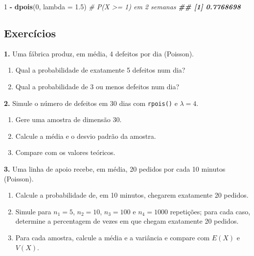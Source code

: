 \documentclass[
  portuguese,
  11pt,
  openany]{book}
\newenvironment{Shaded}{\begin{snugshade}}{\end{snugshade}}
\newcommand{\AttributeTok}[1]{\textcolor[rgb]{0.13,0.29,0.53}{#1}}
\newcommand{\CommentTok}[1]{\textcolor[rgb]{0.56,0.35,0.01}{\textit{#1}}}
\newcommand{\DecValTok}[1]{\textcolor[rgb]{0.00,0.00,0.81}{#1}}
\newcommand{\DocumentationTok}[1]{\textcolor[rgb]{0.56,0.35,0.01}{\textbf{\textit{#1}}}}
\newcommand{\FloatTok}[1]{\textcolor[rgb]{0.00,0.00,0.81}{#1}}
\newcommand{\FunctionTok}[1]{\textcolor[rgb]{0.13,0.29,0.53}{\textbf{#1}}}
\newcommand{\NormalTok}[1]{#1}
\newcommand{\SpecialCharTok}[1]{\textcolor[rgb]{0.81,0.36,0.00}{\textbf{#1}}}
\providecommand{\tightlist}{%
  \setlength{\itemsep}{0pt}\setlength{\parskip}{0pt}}
\begin{document}
\begin{Shaded}
\begin{Highlighting}[]
\DecValTok{1} \SpecialCharTok{{-}} \FunctionTok{dpois}\NormalTok{(}\DecValTok{0}\NormalTok{, }\AttributeTok{lambda =} \FloatTok{1.5}\NormalTok{)                  }\CommentTok{\# P(X \textgreater{}= 1) em 2 semanas}
\DocumentationTok{\#\# [1] 0.7768698}
\end{Highlighting}
\end{Shaded}

\subsection{Exercícios}\label{exercuxedcios-29}

\textbf{1.} Uma fábrica produz, em média, 4 defeitos por dia (Poisson).

\begin{enumerate}
\def\labelenumi{(\alph{enumi})}
\tightlist
\item
  Qual a probabilidade de exatamente 5 defeitos num dia?
\item
  Qual a probabilidade de 3 ou menos defeitos num dia?
\end{enumerate}

\textbf{2.} Simule o número de defeitos em 30 dias com \texttt{rpois()} e \(\lambda = 4\).

\begin{enumerate}
\def\labelenumi{(\alph{enumi})}
\tightlist
\item
  Gere uma amostra de dimensão 30.
\item
  Calcule a média e o desvio padrão da amostra.
\item
  Compare com os valores teóricos.
\end{enumerate}

\textbf{3.} Uma linha de apoio recebe, em média, 20 pedidos por cada 10 minutos (Poisson).

\begin{enumerate}
\def\labelenumi{(\alph{enumi})}
\tightlist
\item
  Calcule a probabilidade de, em 10 minutos, chegarem exatamente 20 pedidos.
\item
  Simule para \(n_1 = 5\), \(n_2 = 10\), \(n_3 = 100\) e \(n_4 = 1000\) repetições; para cada
  caso, determine a percentagem de vezes em que chegam exatamente 20 pedidos.
\item
  Para cada amostra, calcule a média e a variância e compare com \(E(X)\) e \(V(X)\).
\end{enumerate}
\end{document}
